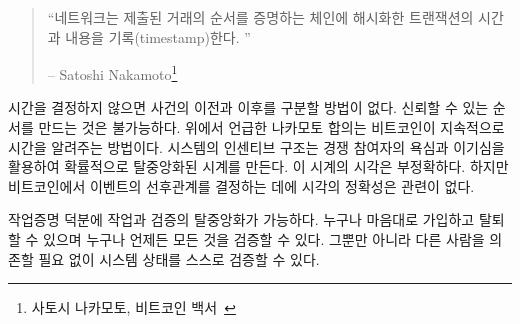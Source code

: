 \begin{quotation}\begin{samepage}
		\enquote{네트워크는 제출된 거래의 순서를 증명하는 체인에 해시화한 트랜잭션의 시간과 내용을 기록(timestamp)한다. }
		\begin{flushright} -- Satoshi Nakamoto\footnote{사토시 나카모토, 비트코인 백서~\cite{whitepaper}}
\end{flushright}\end{samepage}\end{quotation}

\begin{comment}
	Without a consistent way to tell the time, there is no consistent way to
	tell before from after. Reliable ordering is impossible. As mentioned
	above, Nakamoto consensus is Bitcoin's way to consistently tell the
	time. The system's incentive structure produces a probabilistic,
	decentralized clock, by utilizing both greed and self-interest of
	competing participants. The fact that this clock is imprecise is
	irrelevant because the order of events is eventually unambiguous and can
	be verified by anyone.
\end{comment}
시간을 결정하지 않으면 사건의 이전과 이후를 구분할 방법이 없다.
신뢰할 수 있는 순서를 만드는 것은 불가능하다.
위에서 언급한 나카모토 합의는 비트코인이 지속적으로 시간을 알려주는 방법이다.
시스템의 인센티브 구조는 경쟁 참여자의 욕심과 이기심을 활용하여 확률적으로 탈중앙화된 시계를 만든다.
이 시계의 시각은 부정확하다. 
하지만 비트코인에서 이벤트의 선후관계를 결정하는 데에 시각의 정확성은 관련이 없다.

\begin{comment}
	Thanks to proof-of-work, both the work \textit{and} the validation of the work
	are radically decentralized. Everyone can join and leave at will, and
	everyone can validate everything at all times. Not only that, but
	everyone can validate the state of the system \textit{individually}, without
	having to rely on anyone else for validation.
\end{comment}
작업증명 덕분에 작업과 검증의 탈중앙화가 가능하다.
누구나 마음대로 가입하고 탈퇴할 수 있으며 누구나 언제든 모든 것을 검증할 수 있다.
그뿐만 아니라 다른 사람을 의존할 필요 없이 시스템 상태를 스스로 검증할 수 있다.


